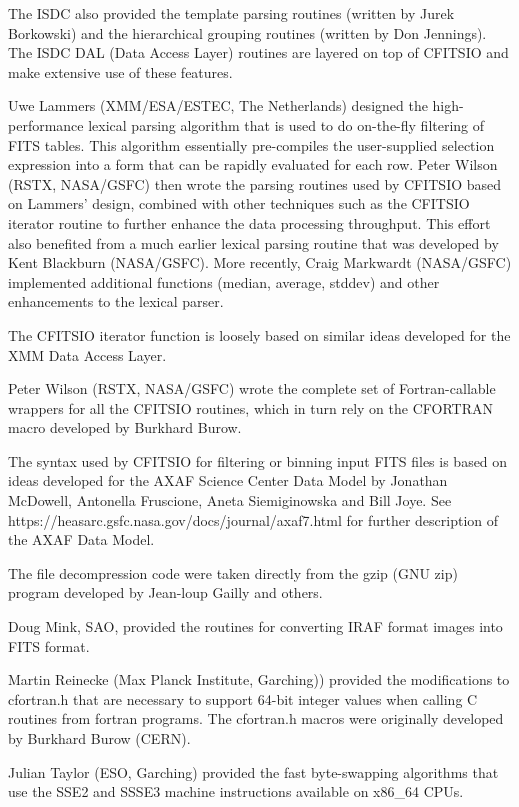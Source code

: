 \documentclass[11pt]{book}
\begin{document}
The ISDC also provided the template parsing routines (written by Jurek
Borkowski) and the hierarchical grouping routines (written by Don
Jennings).  The ISDC DAL (Data Access Layer) routines are layered on
top of CFITSIO and make extensive use of these features.

Uwe Lammers (XMM/ESA/ESTEC, The Netherlands) designed the
high-performance lexical parsing algorithm that is used to do
on-the-fly filtering of FITS tables.  This algorithm essentially
pre-compiles the user-supplied selection expression into a form that
can be rapidly evaluated for each row.  Peter Wilson (RSTX, NASA/GSFC)
then wrote the parsing routines used by CFITSIO based on Lammers'
design, combined with other techniques such as the CFITSIO iterator
routine to further enhance the data processing throughput.  This effort
also benefited from a much earlier lexical parsing routine that was
developed by Kent Blackburn (NASA/GSFC). More recently, Craig Markwardt
(NASA/GSFC) implemented additional functions (median, average, stddev)
and other enhancements to the lexical parser.

The CFITSIO iterator function is loosely based on similar ideas
developed for the XMM Data Access Layer.

Peter Wilson (RSTX, NASA/GSFC) wrote the complete set of
Fortran-callable wrappers for all the CFITSIO routines, which in turn
rely on the CFORTRAN macro developed by Burkhard Burow.

The syntax used by CFITSIO for filtering or binning input FITS files is
based on ideas developed for the AXAF Science Center Data Model by
Jonathan McDowell, Antonella Fruscione, Aneta Siemiginowska and Bill
Joye. See https://heasarc.gsfc.nasa.gov/docs/journal/axaf7.html for
further description of the AXAF Data Model.

The file decompression code were taken directly from the gzip (GNU zip)
program developed by Jean-loup Gailly and others.

Doug Mink, SAO, provided the routines for converting IRAF format
images into FITS format.

Martin Reinecke (Max Planck Institute, Garching)) provided the modifications to
cfortran.h that are necessary to support 64-bit integer values when calling
C routines from fortran programs.  The cfortran.h macros were originally developed
by Burkhard Burow (CERN).

Julian Taylor (ESO, Garching) provided the fast byte-swapping algorithms
that use the SSE2 and SSSE3 machine instructions available on x86\_64 CPUs.
\end{document}
